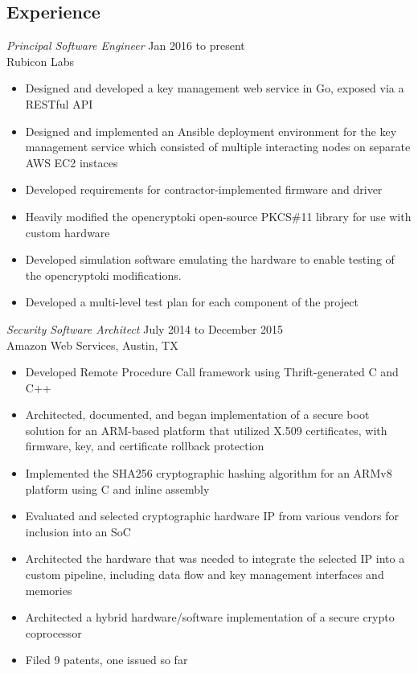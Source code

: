 \documentclass[overlapped]{res}
\begin{document}
\begin{resume}
\section{Experience}
{\sl Principal Software Engineer} \hfill Jan 2016 to present \\
    Rubicon Labs
\begin{itemize}
    \item Designed and developed a key management web service in Go, exposed via a RESTful API
    \item Designed and implemented an Ansible deployment environment for the key
    management service which consisted of multiple interacting nodes on separate AWS
    EC2 instaces
    \item Developed requirements for contractor-implemented firmware and driver
    \item Heavily modified the opencryptoki open-source PKCS\#11 library for use with 
    custom hardware
    \item Developed simulation software emulating the hardware to enable testing of the
    opencryptoki modifications.
    \item Developed a multi-level test plan for each component of the project
\end{itemize}
{\sl Security Software Architect} \hfill July 2014 to December 2015 \\
	Amazon Web Services, Austin, TX
\begin{itemize}
    \item Developed Remote Procedure Call framework using Thrift-generated C and C++
	\item Architected, documented, and began implementation of a secure boot solution for an ARM-based platform that utilized X.509 certificates, with firmware, key, and certificate rollback protection
	\item Implemented the SHA256 cryptographic hashing algorithm for an ARMv8 platform using C and inline assembly
	\item Evaluated and selected cryptographic hardware IP from various vendors for inclusion into an SoC
	\item Architected the hardware that was needed to integrate the selected IP into a custom pipeline, including data flow and key management interfaces and memories
	\item Architected a hybrid hardware/software implementation of a secure crypto coprocessor
	\item Filed 9 patents, one issued so far
\end{itemize}

\end{resume}
\end{document}
